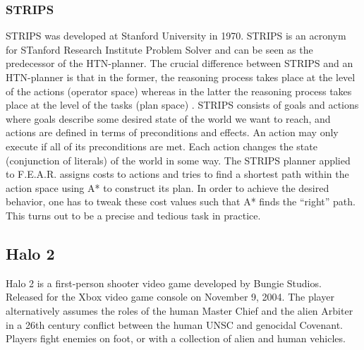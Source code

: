 \subsubsection{STRIPS}
STRIPS was developed at Stanford University in 1970. STRIPS is an acronym for
STanford Research Institute Problem Solver \cite{russell} and can be seen as
the predecessor of the HTN-planner. The crucial difference between STRIPS and
an HTN-planner is that in the former, the reasoning process takes place at the
level of the actions (operator space) whereas in the latter the reasoning
process takes place at the level of the tasks (plan space) \cite{htnstrips,
htnstrips2, htnstrips3}. STRIPS consists of goals and actions where goals
describe some desired state of the world we want to reach, and actions are
defined in terms of preconditions and effects. An action may only execute if
all of its preconditions are met.  Each action changes the state (conjunction
of literals) of the world in some way.  The STRIPS planner applied to F.E.A.R.
assigns costs to actions and tries to find a shortest path within the action
space using A* to construct its plan. In order to achieve the desired behavior,
one has to tweak these cost values such that A* finds the ``right'' path. This
turns out to be a precise and tedious task in practice.

\subsection{Halo 2}
Halo 2 is a first-person shooter video game developed by Bungie Studios.
Released for the Xbox video game console on November 9, 2004. The player
alternatively assumes the roles of the human Master Chief and the alien Arbiter
in a 26th century conflict between the human UNSC and genocidal Covenant.
Players fight enemies on foot, or with a collection of alien and human
vehicles.
